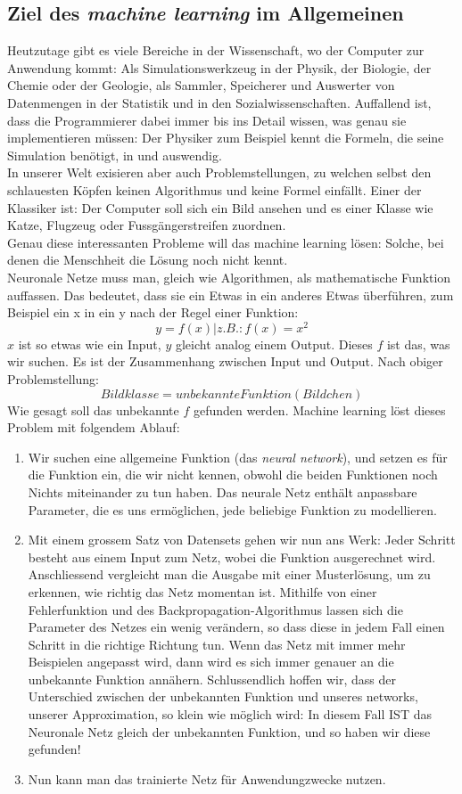 \documentclass[12pt,a4paper]{article}
\begin{document}
\subsection{Ziel des \textit{machine learning}  im Allgemeinen}
Heutzutage gibt es viele Bereiche in der Wissenschaft, wo der Computer zur Anwendung kommt: Als Simulationswerkzeug in der Physik, der Biologie, der Chemie oder der Geologie, als Sammler, Speicherer und Auswerter von Datenmengen in der Statistik und in den Sozialwissenschaften. Auffallend ist, dass die Programmierer dabei immer bis ins Detail wissen, was genau sie implementieren müssen: Der Physiker zum Beispiel kennt die Formeln, die seine Simulation benötigt, in und auswendig.\\
In unserer Welt exisieren aber auch Problemstellungen, zu welchen selbst den schlauesten Köpfen keinen Algorithmus und keine Formel einfällt. Einer der Klassiker ist: Der Computer soll sich ein Bild ansehen und es einer Klasse wie Katze, Flugzeug oder Fussgängerstreifen zuordnen.\\
Genau diese interessanten Probleme will das machine learning lösen: Solche, bei denen die Menschheit die Lösung noch nicht kennt.\\
Neuronale Netze muss man, gleich wie Algorithmen, als mathematische Funktion auffassen. Das bedeutet, dass sie ein Etwas in ein anderes Etwas überführen, zum Beispiel ein x in ein y nach der Regel einer Funktion: 
	$$y = f(x) |  z.B.: f(x) = x^2$$
$x$ ist so etwas wie ein Input, $y$ gleicht analog einem Output.
Dieses $f$ ist das, was wir suchen. Es ist der Zusammenhang zwischen Input und Output. Nach obiger Problemstellung:
	$$Bildklasse = unbekannteFunktion( Bildchen )$$
Wie gesagt soll das unbekannte $f$ gefunden werden. Machine learning löst dieses Problem mit folgendem Ablauf:
\begin{enumerate}
\item{Wir suchen eine allgemeine Funktion (das \textit{neural network}), und setzen es für die Funktion ein, die wir nicht kennen, obwohl die beiden Funktionen noch Nichts miteinander zu tun haben. Das neurale Netz enthält anpassbare Parameter, die es uns ermöglichen, jede beliebige Funktion zu modellieren.}
\item{Mit einem grossem Satz von Datensets gehen wir nun ans Werk: Jeder Schritt besteht aus einem Input zum Netz, wobei die Funktion ausgerechnet wird. Anschliessend vergleicht man die Ausgabe mit einer Musterlösung, um zu erkennen, wie richtig das Netz momentan ist. Mithilfe von einer Fehlerfunktion und des Backpropagation-Algorithmus lassen sich die Parameter des Netzes ein wenig verändern, so dass diese in jedem Fall einen Schritt in die richtige Richtung tun.
Wenn das Netz mit immer mehr Beispielen angepasst wird, dann wird es sich immer genauer an die unbekannte Funktion annähern. Schlussendlich hoffen wir, dass der Unterschied zwischen der unbekannten Funktion und unseres networks, unserer Approximation, so klein wie möglich wird: In diesem Fall IST das Neuronale Netz gleich der unbekannten Funktion, und so haben wir diese gefunden!}
\item{Nun kann man das trainierte Netz für Anwendungzwecke nutzen.}
\end{enumerate}
 
\end{document}

